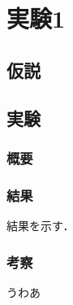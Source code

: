 \chapter{実験1}
\label{chap:experiment1}


\section{仮説}

\section{実験}
\subsection{概要}

\subsection{結果}
結果を示す．

\subsection{考察}
うわあ
